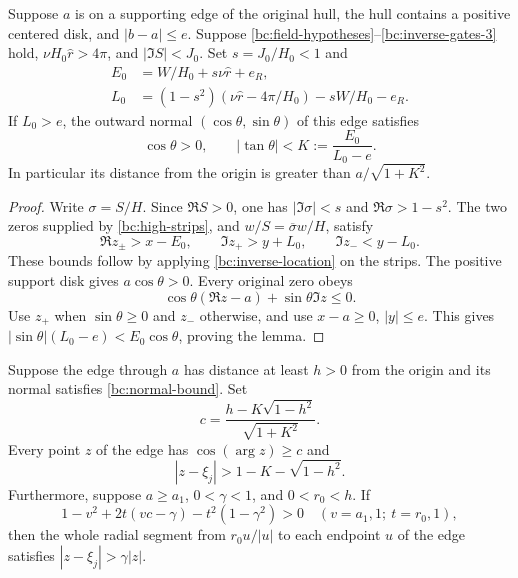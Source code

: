 \begin{lemma}\label{bc:edge-normal}
Suppose $a$ is on a supporting edge of the original hull, the hull
contains a positive centered disk, and $|b-a|\leq e$.  Suppose
\eqref{bc:field-hypotheses}--\eqref{bc:inverse-gates-3} hold,
$\nu H_0\widehat r>4\pi$, and $|\Im S|<J_0$.
Set $s=J_0/H_0<1$ and
\begin{align}
 E_0&=W/H_0+s\nu\widehat r+e_R,\nonumber\\
 L_0&=(1-s^2)(\nu\widehat r-4\pi/H_0)-sW/H_0-e_R.
                                                        \label{bc:normal-errors}
\end{align}
If $L_0>e$, the outward normal $(\cos\theta,\sin\theta)$ of this
edge satisfies
\begin{equation}\label{bc:normal-bound}
 \cos\theta>0,\qquad |\tan\theta|<K:=\frac{E_0}{L_0-e}.
\end{equation}
In particular its distance from the origin is greater than
$a/\sqrt{1+K^2}$.
\end{lemma}

\begin{proof}
Write $\sigma=S/H$.  Since $\Re S>0$, one has
$|\Im\sigma|<s$ and $\Re\sigma>1-s^2$.  The two zeros supplied
by \eqref{bc:high-strips}, and $w/S=\overline\sigma w/H$, satisfy
\[
 \Re z_\pm>x-E_0,\qquad
 \Im z_+>y+L_0,\qquad \Im z_-<y-L_0.
\]
These bounds follow by applying \eqref{bc:inverse-location} on the
strips.
The positive support disk gives $a\cos\theta>0$.  Every original
zero obeys
\[
 \cos\theta(\Re z-a)+\sin\theta\Im z\leq0.
\]
Use $z_+$ when $\sin\theta\geq0$ and $z_-$ otherwise, and use
$x-a\geq0$, $|y|\leq e$.  This gives
$|\sin\theta|(L_0-e)<E_0\cos\theta$, proving the lemma.
\end{proof}

\begin{lemma}
\label{bc:edge-geometry}
Suppose the edge through $a$ has distance at least $h>0$ from the
origin and its normal satisfies \eqref{bc:normal-bound}.  Set
\[
 c=\frac{h-K\sqrt{1-h^2}}{\sqrt{1+K^2}}.
\]
Every point $z$ of the edge has $\cos(\arg z)\geq c$ and
\begin{equation}\label{bc:whole-edge-gap}
 |z-\xi_j|>1-K-\sqrt{1-h^2}.
\end{equation}
Furthermore, suppose $a\geq a_1$, $0<\gamma<1$, and $0<r_0<h$.
If
\begin{equation}\label{bc:four-corners}
 1-v^2+2t(vc-\gamma)-t^2(1-\gamma^2)>0
 \quad(v=a_1,1;\ t=r_0,1),
\end{equation}
then the whole radial segment from $r_0u/|u|$ to each endpoint $u$
of the edge satisfies $|z-\xi_j|>\gamma|z|$.
\end{lemma}

